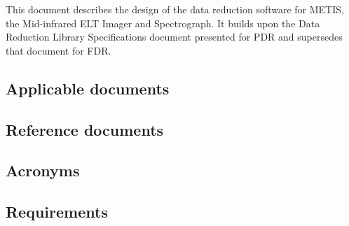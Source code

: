 \documentclass[11pt,oneside,a4paper]{article}
\begin{document}
This document describes the design of the data reduction software for
METIS, the Mid-infrared ELT Imager and Spectrograph. It builds upon
the Data Reduction Library Specifications document \cite{DRLS}
presented for \ac{PDR} and supersedes that document for \ac{FDR}.

\subsection{Applicable documents}

\begin{refcontext}[labelprefix=AD]
  \printbibliography[keyword=applicable, heading=none]
\end{refcontext}


\subsection{Reference documents}

\begin{refcontext}[labelprefix=RD]
  \printbibliography[keyword=reference, heading=none]
\end{refcontext}

\subsection{Acronyms}
\label{ssec:acronyms}


\subsection{Requirements}
\label{ssec:requirements}


\clearpage







% 


\clearpage
% 

\clearpage




% 
% 
% 
% 
% 
% 
% 


% 









\appendix



\end{document}
